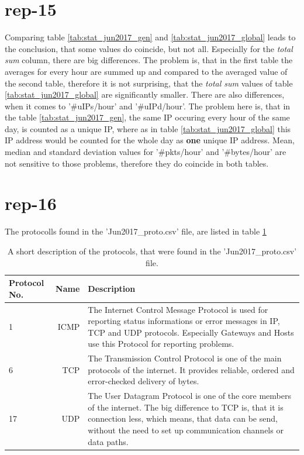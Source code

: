 \section*{rep-15}
Comparing table \ref{tab:stat_jun2017_gen} and \ref{tab:stat_jun2017_global} leads to the conclusion, that some values do coincide, but not all. Especially for the \textit{total sum} column, there are big differences. The problem is, that in the first table the averages for every hour are summed up and compared to the averaged value of the second table, therefore it is not surprising, that the \textit{total sum} values of table \ref{tab:stat_jun2017_global} are significantly smaller.
There are also differences, when it comes to '\#uIPs/hour' and '\#uIPd/hour'. The problem here is, that in the table \ref{tab:stat_jun2017_gen}, the same IP occuring every hour of the same day, is counted as a unique IP, where as in table \ref{tab:stat_jun2017_global} this IP address would be counted for the whole day as \textbf{one} unique IP address.
Mean, median and standard deviation values for '\#pkts/hour' and '\#bytes/hour' are not sensitive to those problems, therefore they do coincide in both tables.

\section*{rep-16}
The protocolls found in the 'Jun2017\_proto.csv' file, are listed in table \ref{tab:proto}

\begin{table}[H]
\center
\begin{tabular}{lrp{5cm}}
\toprule
Protocol No. & Name & Description \\
\midrule
1 & ICMP & The Internet Control Message Protocol is used for reporting status informations or error messages in IP, TCP and UDP protocols. Especially Gateways and Hosts use this Protocol for reporting problems.\\
6 & TCP & The Transmission Control Protocol is one of the main protocols of the internet. It provides reliable, ordered and error-checked delivery of bytes. \\
17 & UDP & The User Datagram Protocol is one of the core members of the internet. The big difference to TCP is, that it is connection less, which means, that data can be send, without the need to set up communication channels or data paths.\\
\bottomrule
\end{tabular}
\caption{A short description of the protocols, that were found in the 'Jun2017\_proto.csv' file.}
\label{tab:proto}
\end{table}

